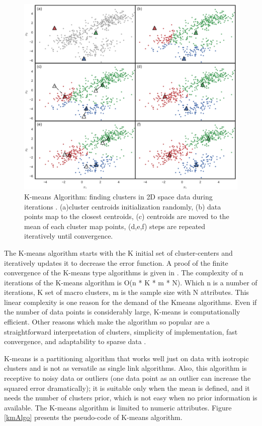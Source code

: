 \documentclass[../UNBThesis2.tex]{subfiles}
\begin{document}
\begin{figure}
\centering
\includegraphics[width = 10 cm]{image/Chapters/Chapter2/kmeanshif.png}
\caption{K-means Algorithm: finding clusters in 2D space data during iterations \protect\cite{benavente2017automatic}. (a)cluster centroids initialization randomly, (b) data points map to the closest centroids, (c) centroids are moved to the mean of each cluster map points, (d,e,f) steps are repeated iteratively until convergence.}
\label{ite}
\end{figure}

The K-means algorithm starts with the K initial set of cluster-centers and iteratively updates it to decrease the error function. A proof of the finite convergence of the K-means type algorithms is given in \cite{selim1984k}. The complexity of n iterations of the K-means algorithm is O(n * K * m * N). Which n is a number of iterations, K set of macro clusters, m is the sample size with N attributes.  This linear complexity is one reason for the demand of the Kmeans algorithms. Even if the number of data points is considerably large, K-means is computationally efficient. 
Other reasons which make the algorithm so popular are a straightforward interpretation of clusters, simplicity of implementation, fast convergence, and adaptability to sparse data \cite{dhillon2001concept}.

 K-means is a partitioning algorithm that works well just on data with isotropic clusters and is not as versatile as single link algorithms.
Also, this algorithm is receptive to noisy data or outliers (one data point as an outlier can increase the squared error dramatically); it is suitable only when the mean is defined, and it needs the number of clusters prior, which is not easy when no prior information is available.
The  K-means algorithm is limited to numeric attributes. 
Figure \ref{kmAlgo} presents the pseudo-code of K-means algorithm.
\end{document}
